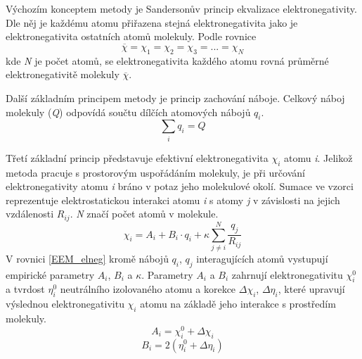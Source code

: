 
Výchozím konceptem metody je Sandersonův princip ekvalizace elektronegativity. Dle něj je každému atomu přiřazena stejná elektronegativita jako je elektronegativita ostatních atomů molekuly. Podle rovnice 
\begin{equation}
\label{Sanders}
    \overline{\chi} = \chi_1 = \chi_2 = \chi_3 = ... = \chi_N
\end{equation}
kde \textit{N} je počet atomů, se elektronegativita každého atomu rovná průměrné elektronegativitě molekuly $\overline{\chi}$. 

Další základním principem metody je princip zachování náboje. Celkový náboj molekuly (\textit{Q}) odpovídá součtu dílčích atomových nábojů $q_i$.
\begin{equation}
\label{EEM_chargesum}
    \sum_{i} q_i = Q
\end{equation}

Třetí základní princip představuje efektivní elektronegativita $\chi_i$ atomu \textit{i}. Jelikož metoda pracuje s prostorovým uspořádáním molekuly, je při určování elektronegativity atomu \textit{i} bráno v potaz jeho molekulové okolí. Sumace ve vzorci reprezentuje elektrostatickou interakci atomu \textit{i} s atomy \textit{j} v závislosti na jejich vzdálenosti $R_{ij}$. \textit{N} značí počet atomů v molekule.
\begin{equation}
\label{EEM_elneg}
    \chi_i = A_i + B_i\cdot q_i + \kappa \sum_{j \neq i}^{N} \frac{q_j}{R_{ij}}
\end{equation}
V rovnici \ref{EEM_elneg} kromě nábojů $q_i$, $q_j$ interagujících atomů vystupují empirické parametry $A_i$, $B_i$ a $\kappa$. Parametry  $A_i$ a $B_i$ zahrnují elektronegativitu $\chi_{i}^{0}$ a tvrdost $\eta_{i}^{0}$ neutrálního izolovaného atomu a korekce $\Delta \chi_i$, $\Delta \eta_i$, které upravují výslednou elektronegativitu $\chi_i$ atomu na základě jeho interakce s prostředím molekuly. 
\begin{equation}
    A_i = \chi_{i}^{0} + \Delta \chi_i
\end{equation}
\begin{equation}
        B_i = 2(\eta_{i}^{0} + \Delta \eta_i)
\end{equation}

